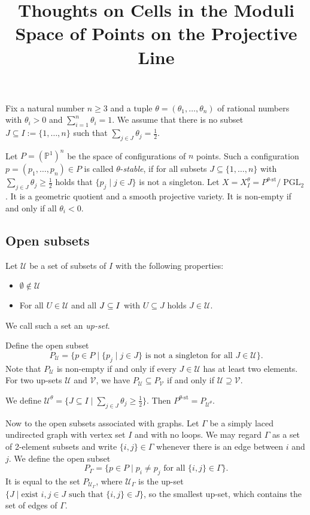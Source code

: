 \documentclass[11pt, a4paper]{amsart}
\title{Thoughts on Cells in the Moduli Space of Points on the Projective Line}
\author{}
\date{}
\begin{document}
	\maketitle
	
	Fix a natural number \(n \geq 3\) and a tuple \(\theta = (\theta_1,\ldots,\theta_n)\) of rational numbers with \(\theta_i > 0\) and \(\sum_{i=1}^n \theta_i = 1\). 
	We assume that there is no subset \(J \subseteq I := \{1,\ldots,n\}\) such that \(\sum_{j \in J} \theta_j = \frac{1}{2}\).

	Let \(P = {(\mathbb{P}^1)}^n\) be the space of configurations of \(n\) points. 
	Such a configuration \(p = (p_1,\ldots,p_n) \in P\) is called \(\theta\)-\emph{stable}, if for all subsets \(J \subseteq \{1,\ldots,n\}\) with \(\sum_{j \in J} \theta_j \geq \frac{1}{2}\) holds that \(\{p_j \mid j \in J\}\) is not a singleton.
	Let \(X = X_I^\theta = P^{\theta\text{-st}}/\operatorname{PGL}_2\). It is a geometric quotient and a smooth projective variety. 
	It is non-empty if and only if all \(\theta_i < 0\).

	\subsection*{Open subsets}
	Let \(\mathcal{U}\) be a set of subsets of \(I\) with the following properties:
	\begin{itemize}
		\item \(\emptyset \notin \mathcal{U}\)
		\item For all \(U \in \mathcal{U}\) and all \(J \subseteq I\) with \(U \subseteq J\) holds \(J \in \mathcal{U}\).
	\end{itemize}
	We call such a set an \emph{up-set}.

	Define the open subset 
	\[ 
		P_\mathcal{U} = \{p \in P \mid \{p_j \mid j \in J\} \text{ is not a singleton for all } J \in \mathcal{U} \}.
	\]
	Note that \(P_{\mathcal{U}}\) is non-empty if and only if every \(J \in \mathcal{U}\) has at least two elements. 
	For two up-sets \(\mathcal{U}\) and \(\mathcal{V}\), we have \(P_{\mathcal{U}} \subseteq P_{\mathcal{V}}\) if and only if \(\mathcal{U} \supseteq \mathcal{V}\).

	We define \(\mathcal{U}^\theta = \{J \subseteq I \mid \sum_{j \in J} \theta_j \geq \frac{1}{2} \}\). 
	Then \(P^{\theta\text{-st}} = P_{\mathcal{U}^\theta}\).

	Now to the open subsets associated with graphs. Let \(\Gamma\) be a simply laced undirected graph with vertex set \(I\) and with no loops.
	We may regard \(\Gamma\) as a set of 2-element subsets and write \(\{i,j\} \in \Gamma\) whenever there is an edge between \(i\) and \(j\). 
	We define the open subset 
	\[
		P_\Gamma = \{p \in P \mid p_i \neq p_j \text{ for all } \{i,j\} \in \Gamma \}.
	\]
	It is equal to the set \(P_{\mathcal{U}_\Gamma}\), where \(\mathcal{U}_\Gamma\) is the up-set \(\{J \mid \text{exist } i,j \in J \text{ such that } \{i,j\} \in J\}\), so the smallest up-set, which contains the set of edges of \(\Gamma\).
\end{document}
